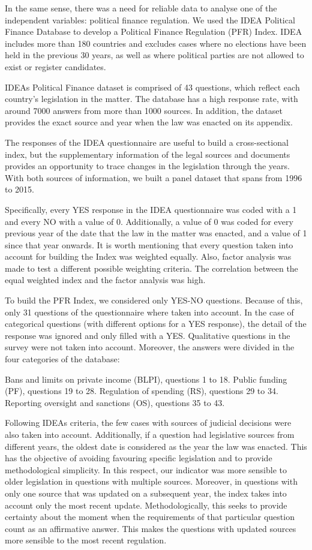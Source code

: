 \documentclass[12,twoside]{article}
\begin{document}
In the same sense, there was a need for reliable data to analyse one of
the independent variables: political finance regulation. We used the
IDEA Political Finance Database to develop a Political Finance
Regulation (PFR) Index. IDEA includes more than 180 countries and
excludes cases where no elections have been held in the previous 30
years, as well as where political parties are not allowed to exist or
register candidates.

IDEAs Political Finance dataset is comprised of 43 questions, which
reflect each country's legislation in the matter. The database has a
high response rate, with around 7000 answers from more than 1000
sources. In addition, the dataset provides the exact source and year
when the law was enacted on its appendix.

The responses of the IDEA questionnaire are useful to build a
cross-sectional index, but the supplementary information of the legal
sources and documents provides an opportunity to trace changes in the
legislation through the years. With both sources of information, we
built a panel dataset that spans from 1996 to 2015.

Specifically, every YES response in the IDEA questionnaire was coded
with a 1 and every NO with a value of 0. Additionally, a value of 0 was
coded for every previous year of the date that the law in the matter was
enacted, and a value of 1 since that year onwards. It is worth
mentioning that every question taken into account for building the Index
was weighted equally. Also, factor analysis was made to test a different
possible weighting criteria. The correlation between the equal weighted
index and the factor analysis was high.

To build the PFR Index, we considered only YES-NO questions. Because of
this, only 31 questions of the questionnaire where taken into account.
In the case of categorical questions (with different options for a YES
response), the detail of the response was ignored and only filled with a
YES. Qualitative questions in the survey were not taken into account.
Moreover, the answers were divided in the four categories of the
database:

Bans and limits on private income (BLPI), questions 1 to 18. Public
funding (PF), questions 19 to 28. Regulation of spending (RS), questions
29 to 34. Reporting oversight and sanctions (OS), questions 35 to 43.

Following IDEAs criteria, the few cases with sources of judicial
decisions were also taken into account. Additionally, if a question had
legislative sources from different years, the oldest date is considered
as the year the law was enacted. This has the objective of avoiding
favouring specific legislation and to provide methodological simplicity.
In this respect, our indicator was more sensible to older legislation in
questions with multiple sources. Moreover, in questions with only one
source that was updated on a subsequent year, the index takes into
account only the most recent update. Methodologically, this seeks to
provide certainty about the moment when the requirements of that
particular question count as an affirmative answer. This makes the
questions with updated sources more sensible to the most recent
regulation.
\end{document}
